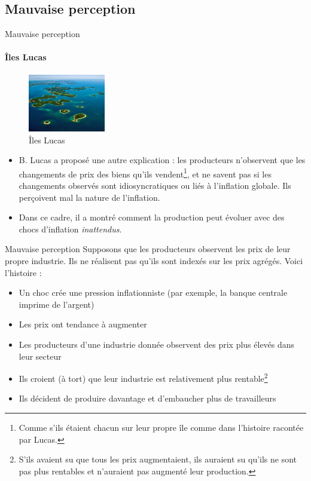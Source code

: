 \documentclass[
  ignorenonframetext,
  aspectratio=169,
]{beamer}
\providecommand{\tightlist}{%
  \setlength{\itemsep}{0pt}\setlength{\parskip}{0pt}}\usepackage{longtable,booktabs,array}
\begin{document}
\subsection{Mauvaise perception}\label{mauvaise-perception}

\begin{frame}{Mauvaise perception}
\label{mauvaise-perception-1}
\framesubtitle{Îles Lucas}

\begin{figure}[H]

{\centering \includegraphics[width=0.3\textwidth,height=\textheight]{assets/lucas_islands.jpg}

}

\caption{Îles Lucas}

\end{figure}%

\begin{itemize}
\tightlist
\item
  B. Lucas a proposé une autre explication : les producteurs n'observent
  que les changements de prix des biens qu'ils
  vendent\footnote{Comme s'ils étaient chacun sur leur propre île comme dans l'histoire racontée par Lucas.},
  et ne savent pas si les changements observés sont idiosyncratiques ou
  liés à l'inflation globale. Ils perçoivent mal la nature de
  l'inflation.
\item
  Dans ce cadre, il a montré comment la production peut évoluer avec des
  chocs d'inflation \emph{inattendus}.
\end{itemize}
\end{frame}

\begin{frame}{Mauvaise perception}
\label{mauvaise-perception-2}
Supposons que les producteurs observent les prix de leur propre
industrie. Ils ne réalisent pas qu'ils sont indexés sur les prix
agrégés. Voici l'histoire :

\begin{itemize}
\tightlist
\item
  Un choc crée une pression inflationniste (par exemple, la banque
  centrale imprime de l'argent)
\item
  Les prix ont tendance à augmenter
\item
  Les producteurs d'une industrie donnée observent des prix plus élevés
  dans leur secteur
\item
  Ils croient (à tort) que leur industrie est relativement plus
  rentable\footnote{S'ils avaient su que tous les prix augmentaient, ils auraient su qu'ils ne sont pas plus rentables et n'auraient pas augmenté leur production.}
\item
  Ils décident de produire davantage et d'embaucher plus de travailleurs
\end{itemize}
\end{frame}
\end{document}
